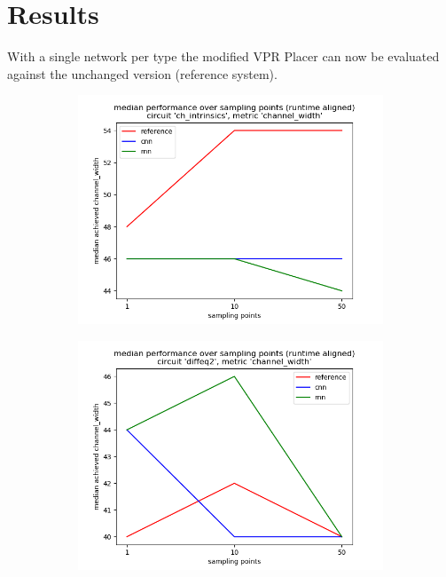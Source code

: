 \section{Results}

With a single network per type the modified \gls{VPR} Placer can now be evaluated against the unchanged version (reference system).

\begin{figure}
	\centering
	\begin{subfigure}[b]{0.45\linewidth}
		\includegraphics[width=\linewidth]{plots/eval-ch_intrinsics-chan-width-median.png}
	\end{subfigure}
	\begin{subfigure}[b]{0.45\linewidth}
		\includegraphics[width=\linewidth]{plots/eval-diffeq2-chan-width-median.png}

\end{subfigure}
\end{figure}
